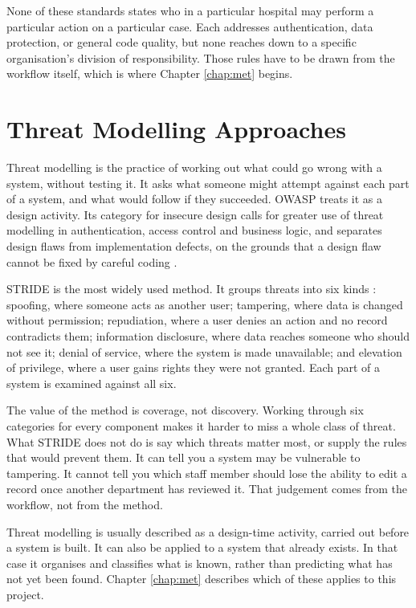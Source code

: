 None of these standards states who in a particular hospital may perform a particular action on a particular case. Each addresses authentication, data protection, or general code quality, but none reaches down to a specific organisation's division of responsibility. Those rules have to be drawn from the workflow itself, which is where Chapter \ref{chap:met} begins.

\section{Threat Modelling Approaches}
\label{sec:lr-threat}

Threat modelling is the practice of working out what could go wrong with a system, without testing it. It asks what someone might attempt against each part of a system, and what would follow if they succeeded. OWASP treats it as a design activity. Its category for insecure design calls for greater use of threat modelling in authentication, access control and business logic, and separates design flaws from implementation defects, on the grounds that a design flaw cannot be fixed by careful coding \cite{owasp2021}.

STRIDE is the most widely used method. It groups threats into six kinds \cite{stride}: spoofing, where someone acts as another user; tampering, where data is changed without permission; repudiation, where a user denies an action and no record contradicts them; information disclosure, where data reaches someone who should not see it; denial of service, where the system is made unavailable; and elevation of privilege, where a user gains rights they were not granted. Each part of a system is examined against all six.

The value of the method is coverage, not discovery. Working through six categories for every component makes it harder to miss a whole class of threat. What STRIDE does not do is say which threats matter most, or supply the rules that would prevent them. It can tell you a system may be vulnerable to tampering. It cannot tell you which staff member should lose the ability to edit a record once another department has reviewed it. That judgement comes from the workflow, not from the method.

Threat modelling is usually described as a design-time activity, carried out before a system is built. It can also be applied to a system that already exists. In that case it organises and classifies what is known, rather than predicting what has not yet been found. Chapter \ref{chap:met} describes which of these applies to this project.


